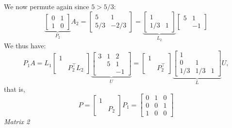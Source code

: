 \documentclass[12pt,a4paper]{article}
\begin{document}
We now permute again since $5 > 5/3$:
\[
\underbrace{\begin{bmatrix} 0 & 1 \\
1 & 0 \end{bmatrix}}_{P_2} A_2 = \begin{bmatrix}5 & 1 \\
5/3 & -2/3 \end{bmatrix} = \underbrace{\begin{bmatrix}1 \\
1/3 & 1 \end{bmatrix}}_{L_2} \begin{bmatrix} 5 & 1 \\ & -1 \end{bmatrix}
\]
We thus have:
\[
P_1 A = L_1 \begin{bmatrix} 1 \\ & P_2^\ensuremath{\top} L_2 \end{bmatrix} \underbrace{\begin{bmatrix}  3 & 1 & 2 \\ 
    & 5 & 1 \\ && -1 \end{bmatrix}}_U 
    = \begin{bmatrix} 1 \\ & P_2^\ensuremath{\top} \end{bmatrix} 
    \underbrace{\begin{bmatrix} 1 \\ 
    0 & 1 \\
    1/3 & 1/3 & 1 \end{bmatrix}}_L U,
\]
that is,
\[
P = \begin{bmatrix} 1 \\ & P_2 \end{bmatrix} P_1 = \begin{bmatrix}
0 & 1 & 0 \\
0 & 0 & 1 \\
1 & 0 & 0
\end{bmatrix}
\]
\emph{Matrix 2}
\end{document}

